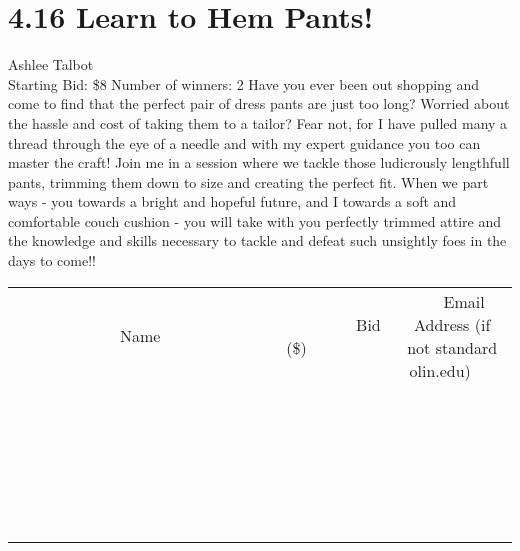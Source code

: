 \documentclass[11pt]{article}
\begin{document}
\section*{4.16 Learn to Hem Pants!}
Ashlee Talbot
\\
Starting Bid: \$8
\newline
Number of winners: 2
\newline
Have you ever been out shopping and come to find that the perfect pair of dress pants are just too long? Worried about the hassle and cost of taking them to a tailor? Fear not, for I have pulled many a thread through the eye of a needle and with my expert guidance you too can master the craft! Join me in a session where we tackle those ludicrously lengthfull pants, trimming them down to size and creating the perfect fit. When we part ways - you towards a bright and hopeful future, and I towards a soft and comfortable couch cushion - you will take with you perfectly trimmed attire and the knowledge and skills necessary to tackle and defeat such unsightly foes in the days to come!!
\\[6ex]
\begin{tabular}{c c c}
~~~~~~~~~~~~~Name~~~~~~~~~~~~~ & ~~~~~~~~~Bid (\$)~~~~~~~~~  & ~~~Email Address (if not standard olin.edu)~~~\\
 & & \\
\hline
 & & \\
\hline
 & & \\
\hline
 & & \\
\hline
 & & \\
\hline
 & & \\
\hline
 & & \\
\hline
 & & \\
\hline
 & & \\
\hline
 & & \\
\hline
 & & \\
\hline
 & & \\
\hline
 & & \\
\hline
 & & \\
\hline
 & & \\
\hline
 & & \\
\hline
 & & \\
\hline
 & & \\
\hline
 & & \\
\hline
 & & \\
\hline
 & & \\
\hline
 & & \\
\hline
 & & \\
\hline
 & & \\
\hline
 & & \\
\hline
 & & \\
\hline
\end{tabular}
\newpage
\end{document}
